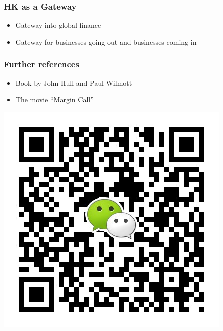 \documentclass{beamer}
\begin{document}
\begin{frame}\frametitle{HK as a Gateway}
    \begin{itemize}
\item Gateway into global finance
\item Gateway for businesses going out and businesses coming in
    \end{itemize}
\end{frame}

\begin{frame}\frametitle{Further references}
  \begin{itemize}
  \item Book by John Hull and Paul Wilmott
  \item The movie ``Margin Call''
  \end{itemize}
  \includegraphics[scale=0.25]{joequant-qr.png}
  \end{frame}
\end{document}
